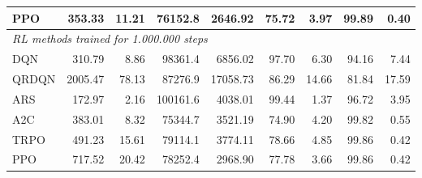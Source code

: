 \begin{samepage}
\begin{center}
\begin{tabular}{l|rr|rr|rr|rr}
    PPO          &   353.33 &    11.21 &    76152.8 &    2646.92 &   75.72 &    3.97 &   99.89 &    0.40 \\
    \midrule
    \multicolumn{9}{l}{\textit{RL methods trained for 1.000.000 steps}} \\
    \midrule
    DQN          &   310.79 &     8.86 &    98361.4 &    6856.02 &   97.70 &    6.30 &   94.16 &    7.44 \\
    QRDQN        &  2005.47 &    78.13 &    87276.9 &   17058.73 &   86.29 &   14.66 &   81.84 &   17.59 \\
    ARS          &   172.97 &     2.16 &   100161.6 &    4038.01 &   99.44 &    1.37 &   96.72 &    3.95 \\
    A2C          &   383.01 &     8.32 &    75344.7 &    3521.19 &   74.90 &    4.20 &   99.82 &    0.55 \\
    TRPO         &   491.23 &    15.61 &    79114.1 &    3774.11 &   78.66 &    4.85 &   99.86 &    0.42 \\
    PPO          &   717.52 &    20.42 &    78252.4 &    2968.90 &   77.78 &    3.66 &   99.86 &    0.42 \\
    \bottomrule
  \end{tabular}
\end{center}
\end{samepage}

